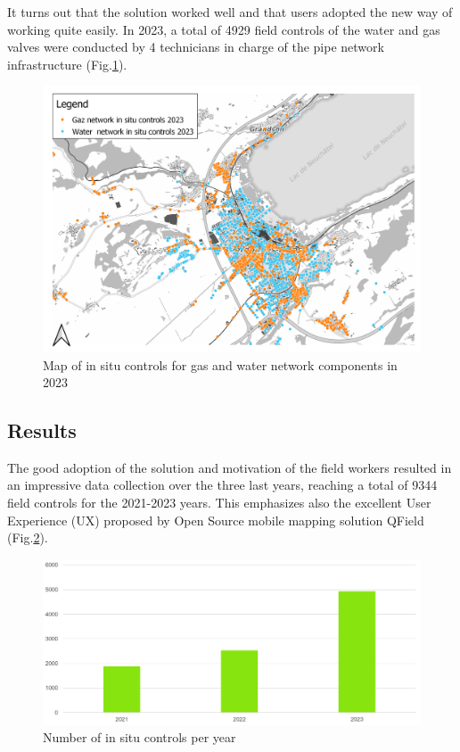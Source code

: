 \documentclass[runningheads]{llncs}
\begin{document}
It turns out that the solution worked well and that users adopted the new way of working quite easily. In 2023, a total of 4929 field controls of the water and gas valves were conducted by 4 technicians in charge of the pipe network infrastructure (Fig.\ref{fig1}).

\begin{figure}
	\includegraphics[width=\textwidth]{water_gas_2023.png}
	\caption{Map of in situ controls for gas and water network components in 2023} \label{fig1}
\end{figure}


\subsection{Results}

The good adoption of the solution and motivation of the field workers resulted in an impressive data collection over the three last years, reaching a total of 9344 field controls for the 2021-2023 years. This emphasizes also the excellent User Experience (UX) proposed by Open Source mobile mapping solution QField\cite{ref_qfield} (Fig.\ref{fig2}).

\begin{figure}
	\includegraphics[width=\textwidth]{stats.png}
	\caption{Number of in situ controls per year} \label{fig2}
\end{figure}
\end{document}
